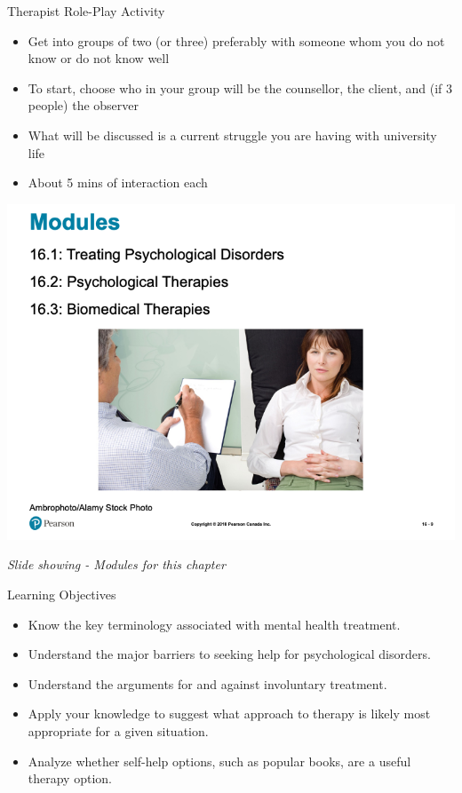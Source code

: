 \documentclass[
]{book}
\providecommand{\tightlist}{%
  \setlength{\itemsep}{0pt}\setlength{\parskip}{0pt}}
\begin{document}
\begin{reflect}
Therapist Role-Play Activity

\begin{itemize}
\tightlist
\item
  Get into groups of two (or three) preferably with someone whom you do not know or do not know well\\
\item
  To start, choose who in your group will be the counsellor, the client, and (if 3 people) the observer\\
\item
  What will be discussed is a current struggle you are having with university life\\
\item
  About 5 mins of interaction each
\end{itemize}

\includegraphics{assets/unit_11/slide_9.png}

\emph{Slide showing - Modules for this chapter}

Learning Objectives

\begin{itemize}
\tightlist
\item
  Know the key terminology associated with mental health treatment.\\
\item
  Understand the major barriers to seeking help for psychological disorders.\\
\item
  Understand the arguments for and against involuntary treatment.\\
\item
  Apply your knowledge to suggest what approach to therapy is likely most appropriate for a given situation.\\
\item
  Analyze whether self-help options, such as popular books, are a useful therapy option.
\end{itemize}


\end{reflect}
\end{document}
